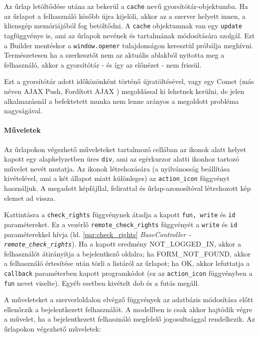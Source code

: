 \documentclass[12pt,a4paper,twoside]{article}
\begin{document}
Az űrlap letöltődése utána az bekerül a \texttt{cache} nevű
gyorsítótár-objektumba. Ha az űrlapot a felhasználó később újra kijelöli, akkor
az a szerver helyett innen, a kliensgép memóriájából fog betöltődni. A
\texttt{cache} objektumnak van egy \texttt{update} tagfüggvénye is, ami az
űrlapok nevének és tartalmának módosítására szolgál. Ezt a Builder mentéskor a
\texttt{window.opener} tulajdonságon keresztül próbálja meghívni. Természetesen
ha a szerkesztőt nem az aktuális ablakból nyitotta meg a felhasználó, akkor a
gyorsítótár - és így az előnézet - nem frissül.

Ezt a gyorsítótár adott időközönként történő újratöltésével, vagy egy Comet (más
néven AJAX Push, Fordított AJAX \cite{comet}) megoldással ki lehetnek kerülni,
de jelen alkalmazásnál a befektetett munka nem lenne arányos a megoldott
probléma nagyságával.


\paragraph{Műveletek}
Az űrlapokon végezhető műveleteket tartalmozó cellában az ikonok alatt helyet
kapott egy alaphelyzetben üres \texttt{div}, ami az egérkurzor alatti ikonhoz
tartozó művelet nevét mutatja. Az ikonok létrehozására (a nyilvánosság
beállítása kivételével, ami a két állapot miatt különleges) az
\texttt{action\_icon} függvényt használjuk. A megadott képfájllal, felirattal és
űrlap-azonosítóval létrehozott kép elemet ad vissza.

Kattintásra a \texttt{check\_rights} függvénynek átadja a kapott \texttt{fun,
  write} és \texttt{id} paramétereket. Ez a vezérlő
\texttt{remote\_check\_rights} függvényét a \texttt{write} és \texttt{id}
paraméterekkel hívja (ld. \ref{par:check_rights} \textit{BaseController -
\texttt{remote\_check\_rights}}). Ha a kapott eredmény NOT\_LOGGED\_IN, akkor a
felhasználót átirányítja a bejelentkező oldalra; ha FORM\_NOT\_FOUND, akkor a
felhasználó értesítése után törli a listáról az űrlapot; ha OK, akkor lefuttatja
a \texttt{callback} paraméterben kapott programkódot (ez az
\texttt{action\_icon} függvényben a \texttt{fun} nevet viselte). Egyéb esetben
kivételt dob és a futás megáll.

A műveleteket a szerverloldalon elvégző függvények az adatbázis módosítása előtt
ellenőrzik a bejelentkezett felhasználót. A modellben is csak akkor hajtódik
végre a művelet, ha a bejelentkezett felhasználó megfelelő jogosultsággal
rendelkezik. Az űrlapokon végezhető műveletek:
\end{document}
